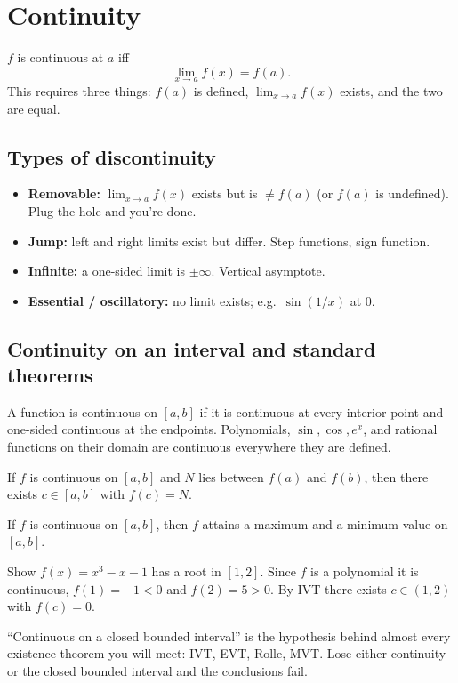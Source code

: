 \section{Continuity}

\begin{definition}
$f$ is continuous at $a$ iff
\[ \lim_{x \to a} f(x) = f(a). \]
This requires three things: $f(a)$ is defined, $\lim_{x\to a} f(x)$ exists, and the two are equal.
\end{definition}

\subsection{Types of discontinuity}
\begin{itemize}[leftmargin=*,nosep]
  \item \textbf{Removable:} $\lim_{x\to a} f(x)$ exists but is $\ne f(a)$ (or $f(a)$ is undefined). Plug the hole and you're done.
  \item \textbf{Jump:} left and right limits exist but differ. Step functions, sign function.
  \item \textbf{Infinite:} a one-sided limit is $\pm\infty$. Vertical asymptote.
  \item \textbf{Essential / oscillatory:} no limit exists; e.g.\ $\sin(1/x)$ at $0$.
\end{itemize}

\subsection{Continuity on an interval and standard theorems}
A function is continuous on $[a,b]$ if it is continuous at every interior point and
one-sided continuous at the endpoints. Polynomials, $\sin, \cos, e^x$, and rational
functions on their domain are continuous everywhere they are defined.

\begin{theorem}
If $f$ is continuous on $[a,b]$ and $N$ lies between $f(a)$ and $f(b)$, then there exists
$c \in [a,b]$ with $f(c) = N$.
\end{theorem}

\begin{theorem}
If $f$ is continuous on $[a,b]$, then $f$ attains a maximum and a minimum value on $[a,b]$.
\end{theorem}

\begin{example}
Show $f(x) = x^3 - x - 1$ has a root in $[1,2]$. Since $f$ is a polynomial it is continuous,
$f(1) = -1 < 0$ and $f(2) = 5 > 0$. By IVT there exists $c \in (1,2)$ with $f(c) = 0$.
\end{example}

\begin{keybox}[Heuristic]
``Continuous on a closed bounded interval'' is the hypothesis behind almost every existence
theorem you will meet: IVT, EVT, Rolle, MVT. Lose either continuity or the closed bounded
interval and the conclusions fail.
\end{keybox}
